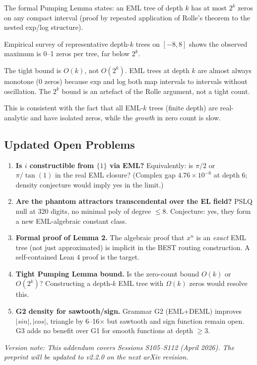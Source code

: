 The formal Pumping Lemma states: an EML tree of depth $k$ has at most
$2^k$ zeros on any compact interval (proof by repeated application of
Rolle's theorem to the nested exp/log structure).

Empirical survey of representative depth-$k$ trees on $[-8,8]$ shows
the observed maximum is 0--1 zeros per tree, far below $2^k$.

\begin{conjecture}
The tight bound is $O(k)$, not $O(2^k)$.
EML trees at depth $k$ are almost always monotone (0 zeros)
because exp and log both map intervals to intervals without oscillation.
The $2^k$ bound is an artefact of the Rolle argument, not a tight count.
\end{conjecture}

This is consistent with the fact that all EML-$k$ trees (finite depth)
are real-analytic and have isolated zeros, while the \emph{growth} in zero
count is slow.

\subsection*{Updated Open Problems}

\begin{enumerate}
  \item \textbf{Is $i$ constructible from $\{1\}$ via EML?}
    Equivalently: is $\pi/2$ or $\pi/\tan(1)$ in the real EML closure?
    (Complex gap $4.76 \times 10^{-6}$ at depth 6; density conjecture would
    imply yes in the limit.)
  \item \textbf{Are the phantom attractors transcendental over the EL field?}
    PSLQ null at 320 digits, no minimal poly of degree $\leq 8$.
    Conjecture: yes, they form a new EML-algebraic constant class.
  \item \textbf{Formal proof of Lemma 2.}
    The algebraic proof that $x^n$ is an \emph{exact} EML tree
    (not just approximated) is implicit in the BEST routing construction.
    A self-contained Lean 4 proof is the target.
  \item \textbf{Tight Pumping Lemma bound.}
    Is the zero-count bound $O(k)$ or $O(2^k)$?
    Constructing a depth-$k$ EML tree with $\Omega(k)$ zeros would resolve this.
  \item \textbf{G2 density for sawtooth/sign.}
    Grammar G2 (EML+DEML) improves $|sin|, |cos|$, triangle by 6--16$\times$
    but sawtooth and sign function remain open.
    G3 adds no benefit over G1 for smooth functions at depth $\geq 3$.
\end{enumerate}

\vspace{1em}
\noindent\textit{Version note: This addendum covers Sessions S105--S112 (April 2026).
The preprint will be updated to v2.2.0 on the next arXiv revision.}
